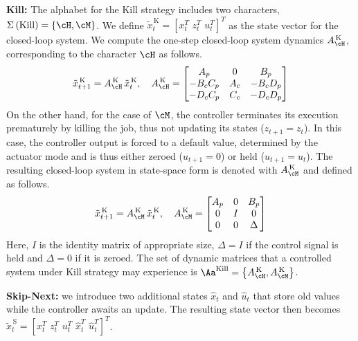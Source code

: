 \textbf{Kill: }%
%
The alphabet for the Kill strategy includes two characters, $\Sigma\left(\text{Kill}\right) = \{ \cH, \cM \}$. We define $\tilde x_t^{\,\text{K}} = \left[ x_t^T\,\, z_t^T\,\, u_t^T \right]^T$ as the state vector for the closed-loop system.
We compute the one-step closed-loop system dynamics $A^{\,\text{K}}_{\cH}$, corresponding to the character $\cH$ as follows.
\begin{equation*}
    \tilde x_{t+1}^{\,\text{K}} = A^{\,\text{K}}_{\cH}\,\tilde x_t^{\,\text{K}}, \quad
     A^{\,\text{K}}_{\cH} = \begin{bmatrix}
        A_p       & 0    & B_p       \\
        -B_cC_p   & A_c  & -B_cD_p   \\
        -D_cC_p   & C_c  & -D_cD_p   \\
    \end{bmatrix}
\end{equation*}
%
On the other hand, for the case of $\cM$, the controller terminates its execution prematurely by killing the job, thus not updating its states ($z_{t+1} = z_t$).
In this case, the controller output is forced to a default value, determined by the actuator mode and is thus either zeroed ($u_{t+1} = 0$) or held ($u_{t+1} = u_t$).
The resulting closed-loop system in state-space form is denoted with $A^{\,\text{K}}_{\cM}$ and defined as follows.
\begin{equation*}
    \tilde x_{t+1}^{\,\text{K}} = A^{\,\text{K}}_{\cM}\,\tilde x_t^{\,\text{K}}, \quad
   A^{\,\text{K}}_{\cM} = \begin{bmatrix}
        A_p & 0  & B_p \\
        0   & I  & 0   \\
        0   & 0  & \Delta
    \end{bmatrix}
\end{equation*}
Here, $I$ is the identity matrix of appropriate size, $\Delta = I$ if the control signal is held and $\Delta = 0$ if it is zeroed.
The set of dynamic matrices that a controlled system under Kill strategy may experience is $\Aa^{\text{Kill}}=\left\{A^{\,\text{K}}_{\cH},A^{\,\text{K}}_{\cM}\right\}$.

\textbf{Skip-Next: }%
%
 we introduce two additional states $\hat x_t$ and $\hat u_t$ that store  old values  while the controller awaits an update.
The resulting state vector then becomes $\tilde x_t^{\,\text{S}} = \left[ x_t^T\,\,z_t^T\,\, u_t^T\,\, \hat{x}_t^T\,\, \hat{u}_t^T \right]^T$.

